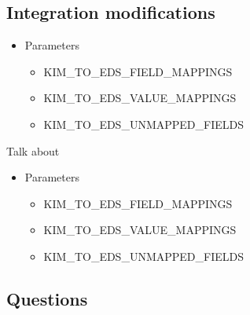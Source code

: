 \documentclass[12pt,notitlepage]{article}
\begin{document}
\begin{s5presentation}
\begin{s5slide}
\begin{s5notes}
      \W \end{s5notes}
    \W \end{s5slide}

  \W \begin{s5slide}
    \section{Integration modifications}
    \begin{itemize}
      \item Parameters
        \begin{itemize}
          \item KIM_TO_EDS_FIELD_MAPPINGS
          \item KIM_TO_EDS_VALUE_MAPPINGS
          \item KIM_TO_EDS_UNMAPPED_FIELDS 
        \end{itemize}
    \end{itemize}

    \W \begin{s5notes}
      \W \end{s5notes}
\W \begin{s5notes}
  Talk about

    \begin{itemize}
      \item Parameters
        \begin{itemize}
          \item KIM_TO_EDS_FIELD_MAPPINGS
          \item KIM_TO_EDS_VALUE_MAPPINGS
          \item KIM_TO_EDS_UNMAPPED_FIELDS 
        \end{itemize}
    \end{itemize}

\W \end{s5notes}
    \W \end{s5slide}

  \W \begin{s5slide}
    \W \section{Questions}

    \W \end {s5slide}
  \W \end{s5presentation}
\end{document}
